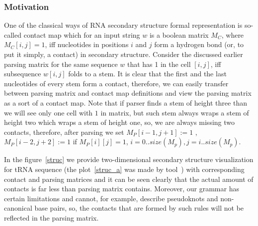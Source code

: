 \documentclass[runningheads]{llncs}
\begin{document}
\subsubsection{Motivation}
One of the classical ways of RNA secondary structure formal representation is so-called contact map which for an input string $w$ is a boolean matrix $M_C$, where $M_C [i,j] = 1$, iff nucleotides in positions $i$ and $j$ form a hydrogen bond (or, to put it simply, a contact) in secondary structure. Consider the discussed earlier parsing matrix for the same sequence $w$ that has 1 in the cell $[i, j]$, iff subsequence $w[i, j]$ folds to a stem. It is clear that the first and the last nucleotides of every stem form a contact, therefore, we can easily transfer between parsing matrix and contact map definitions and view the parsing matrix as a sort of a contact map. Note that if parser finds a stem of height three than we will see only one cell with $1$ in matrix, but such stem always wraps a stem of height two which wraps a stem of height one, so, we are always missing two contacts, therefore, after parsing we set $M_P[i - 1, j + 1] := 1$ , $M_P[i - 2, j + 2] := 1$ if $M_P[i][j] = 1$, $i = 0..size(M_p), j = i..size(M_p)$.

In the figure~\ref{struc} we provide two-dimensional secondary structure visualization for tRNA sequence (the plot~\ref{struc_a} was made by tool~\cite{kerpedjiev2015forna}) with corresponding contact and parsing matrices and it can be seen clearly that the actual amount of contacts is far less than parsing matrix contains. Moreover, our grammar has certain limitations and cannot, for example, describe pseudoknots and non-canonical base pairs, so, the contacts that are formed by such rules will not be reflected in the parsing matrix. 
\end{document}
